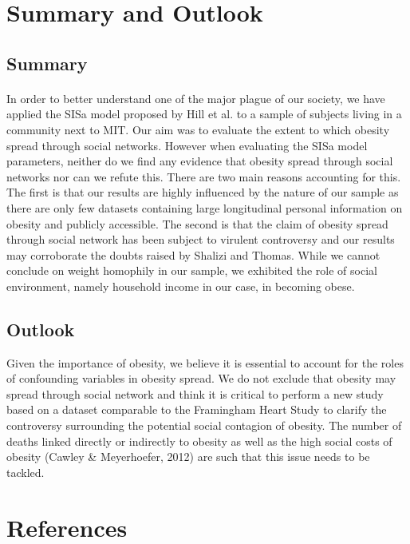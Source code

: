 \documentclass[11pt]{article}
\begin{document}
\section{Summary and Outlook}

\subsection{Summary}

\paragraph{}

In order to better understand one of the major plague of our society, we have applied the SISa model proposed by Hill et al. to a sample of subjects living in a community next to MIT. Our aim was to evaluate the extent to which obesity spread through social networks. However when evaluating the SISa model parameters, neither do we find any evidence that obesity spread through social networks nor can we refute this. There are two main reasons accounting for this. The first is that our results are highly influenced by the nature of our sample as there are only few datasets containing large longitudinal personal information on obesity and publicly accessible. The second is that the claim of obesity spread through social network has been subject to virulent controversy and our results may corroborate the doubts raised by Shalizi and Thomas. While we cannot conclude on weight homophily in our sample, we exhibited the role of social environment, namely household income in our case, in becoming obese. 

\subsection{Outlook}

Given the importance of obesity, we believe it is essential to account for the roles of confounding variables in obesity spread. We do not exclude that obesity may spread through social network and think it is critical to perform a new study based on a dataset comparable to the Framingham Heart Study to clarify the controversy surrounding the potential social contagion of obesity. The number of deaths linked directly or indirectly to obesity as well as the high social costs of obesity (Cawley \& Meyerhoefer, 2012) are such that this issue needs to be tackled.

\newpage
\section{References}
\end{document}
